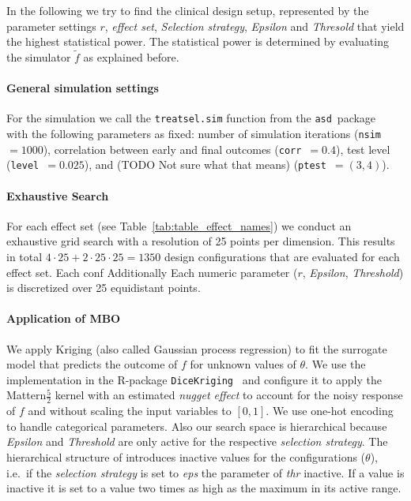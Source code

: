 \documentclass[bimj,fleqn]{w-art}
\theoremstyle{plain}
\theoremstyle{definition}
\begin{document}
In the following we try to find the clinical design setup, represented by the parameter settings $r$, \emph{effect set}, \emph{Selection strategy}, \emph{Epsilon} and \emph{Thresold} that yield the highest statistical power.
The statistical power is determined by evaluating the simulator $\tilde{f}$ as explained before.

\paragraph{General simulation settings}
For the simulation we call the \texttt{treatsel.sim} function from the \texttt{asd}~package~\cite{parsons_software_2011} with the following parameters as fixed:
number of simulation iterations (\texttt{nsim}~$= 1000$), correlation between early and final outcomes  (\texttt{corr}~$= 0.4$), test level (\texttt{level}~$=0.025$), and (TODO Not sure what that means) (\texttt{ptest}~$=(3,4)$).

\paragraph{Exhaustive Search}
For each effect set (see Table~\ref{tab:table_effect_names}) we conduct an exhaustive grid search with a resolution of 25 points per dimension.
This results in total $4 \cdot 25 + 2 \cdot 25 \cdot 25 = 1350$ design configurations that are evaluated for each effect set.
Each conf
Additionally
Each numeric parameter ($r$, \emph{Epsilon}, \emph{Threshold}) is discretized over 25 equidistant points.


\paragraph{Application of MBO}
We apply Kriging (also called Gaussian process regression) to fit the surrogate model that predicts the outcome of $f$ for unknown values of $\theta$.
We use the implementation in the R-package \texttt{DiceKriging}~\citep{roustant_dicekriging_2012} and configure it to apply the Mattern$\frac{5}{2}$ kernel with an estimated \emph{nugget effect} to account for the noisy response of $f$ and without scaling the input variables to $[0,1]$.
We use one-hot encoding to handle categorical parameters.
Also our search space is hierarchical because \emph{Epsilon} and \emph{Threshold} are only active for the respective \emph{selection strategy}.
The hierarchical structure of introduces inactive values for the configurations ($\theta$), i.e.\ if the \emph{selection strategy} is set to \emph{eps} the parameter of \emph{thr} inactive.
If a value is inactive it is set to a value two times as high as the maximum in its active range.
\end{document}
